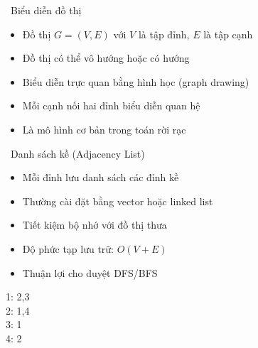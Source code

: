 \documentclass{beamer}
\begin{document}
\begin{frame}{\faProjectDiagram\ Biểu diễn đồ thị}
\begin{tcolorbox}
\begin{itemize}
\item Đồ thị $G = (V, E)$ với $V$ là tập đỉnh, $E$ là tập cạnh
\item Đồ thị có thể vô hướng hoặc có hướng
\item Biểu diễn trực quan bằng hình học (graph drawing)
\item Mỗi cạnh nối hai đỉnh biểu diễn quan hệ
\item Là mô hình cơ bản trong toán rời rạc
\end{itemize}
\end{tcolorbox}

\begin{center}
\end{center}
\end{frame}

\begin{frame}{\faList\ Danh sách kề (Adjacency List)}
\begin{tcolorbox}
\begin{itemize}
\item Mỗi đỉnh lưu danh sách các đỉnh kề
\item Thường cài đặt bằng vector hoặc linked list
\item Tiết kiệm bộ nhớ với đồ thị thưa
\item Độ phức tạp lưu trữ: $O(V + E)$
\item Thuận lợi cho duyệt DFS/BFS
\end{itemize}
\end{tcolorbox}

\begin{center}
1: 2,3 \\
2: 1,4 \\
3: 1 \\
4: 2
\end{center}
\end{frame}
\end{document}
